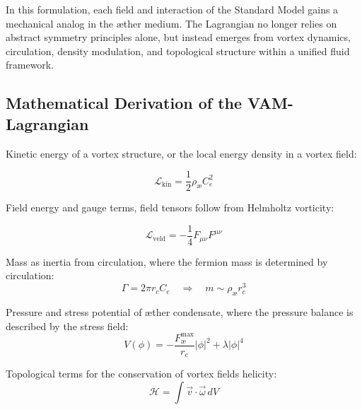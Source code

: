 In this formulation, each field and interaction of the Standard Model gains a mechanical analog in the æther medium. The Lagrangian no longer relies on abstract symmetry principles alone, but instead emerges from vortex dynamics, circulation, density modulation, and topological structure within a unified fluid framework.


\subsection*{Mathematical Derivation of the VAM-Lagrangian}

Kinetic energy of a vortex structure, or the local energy density in a vortex field:

\[
    \mathcal{L}_\text{kin} = \frac{1}{2}\rho_\text{\ae} C_e^2
\]

Field energy and gauge terms, field tensors follow from Helmholtz vorticity:

\[
    \mathcal{L}_\text{veld} = -\frac{1}{4}F_{\mu\nu}F^{\mu\nu}
\]

Mass as inertia from circulation, where the fermion mass is determined by circulation:
\[
    \Gamma = 2\pi r_c C_e \quad\Rightarrow\quad m \sim \rho_\text{\ae} r_c^3
\]

Pressure and stress potential of æther condensate, where the pressure balance is described by the stress field:
\[
    V(\phi) = -\frac{F^{\text{max}}_{\text{\ae}}}{r_c}|\phi|^2 + \lambda|\phi|^4
\]

Topological terms for the conservation of vortex fields helicity:
\[
    \mathcal{H} = \int \vec{v}\cdot\vec{\omega}\, dV
\]

